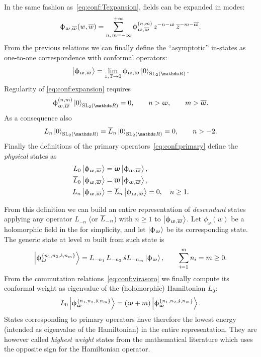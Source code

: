 In the same fashion as~\eqref{eq:conf:Texpansion}, fields can be expanded in modes:
\begin{equation}
  \upphi_{\upomega, \overline{\upomega}}( w, \overline{w} )
  =
  \sum\limits_{n,\, m = -\infty}^{+\infty}
  \upphi_{\upomega, \overline{\upomega}}^{(n, m)}\,
  z^{-n -\upomega}\,
  \overline{z}^{-m -\overline{\upomega}}.
  \label{eq:conf:expansion}
\end{equation}
From the previous relations we can finally define the ``asymptotic'' in-states as one-to-one correspondence with conformal operators:
\begin{equation}
  \ket{\phi_{\omega, \bomega}}
  =
  \lim\limits_{z,\, \barz \to 0}
  \phi_{\omega, \bomega}
  \regvacuum.
\end{equation}
Regularity of \eqref{eq:conf:expansion} requires
\begin{equation}
  \phi_{\omega, \bomega}^{(n, m)}
  \regvacuum
  =
  0,
  \qquad
  n > \omega,
  \qquad
  m > \bomega.
\end{equation}
As a consequence also
\begin{equation}
  L_n \regvacuum
  =
  \barL_n \regvacuum
  =
  0,
  \qquad
  n > -2.
\end{equation}
Finally the definitions of the primary operators~\eqref{eq:conf:primary} define the \emph{physical} states as
\begin{equation}
  \begin{split}
    L_0 \ket{\upphi_{\upomega, \overline{\upomega}}} & = \upomega \ket{\upphi_{\upomega, \overline{\upomega}}},
    \\
    \overline{L}_0 \ket{\upphi_{\upomega, \overline{\upomega}}} & = \overline{\upomega} \ket{\upphi_{\upomega, \overline{\upomega}}},
    \\
    L_n \ket{\upphi_{\upomega, \overline{\upomega}}} & = \overline{L}_n \ket{\upphi_{\upomega, \overline{\upomega}}} = 0,
    \quad
    n \ge 1.
  \end{split}
  \label{eq:conf:physical}
\end{equation}

From this definition we can build an entire representation of \emph{descendant} states applying any operator $L_{-n}$ (or $\overline{L}_{-n}$) with $n \ge 1$ to $\ket{\upphi_{\upomega, \overline{\upomega}}}$.
Let $\phi_{\omega}( w )$ be a holomorphic field in the \cft for simplicity, and let $\ket{\upphi_{\upomega}}$ be its corresponding state.
The generic state at level $m$ built from such state is
\begin{equation}
  \ket{\upphi_{\upomega}^{\lbrace n_1, n_2, \dot{s}, n_m \rbrace}}
  =
  L_{-n_1}\, L_{-n_2}\, \dot{s} L_{-n_m}
  \ket{\upphi_{\upomega}},
  \qquad
  \sum\limits_{i = 1}^{m} n_i = m \ge 0.
\end{equation}
From the commutation relations~\eqref{eq:conf:virasoro} we finally compute its conformal weight as eigenvalue of the (holomorphic) Hamiltonian $L_0$:
\begin{equation}
  L_0 \ket{\upphi_{\upomega}^{\lbrace n_1, n_2, \dot{s}, n_m \rbrace}}
  =
  (\upomega + m) \ket{\upphi_{\upomega}^{\lbrace n_1, n_2, \dot{s}, n_m \rbrace}}.
\end{equation}
States corresponding to primary operators have therefore the lowest energy (intended as eigenvalue of the Hamiltonian) in the entire representation.
They are however called \emph{highest weight} states from the mathematical literature which uses the opposite sign for the Hamiltonian operator.

